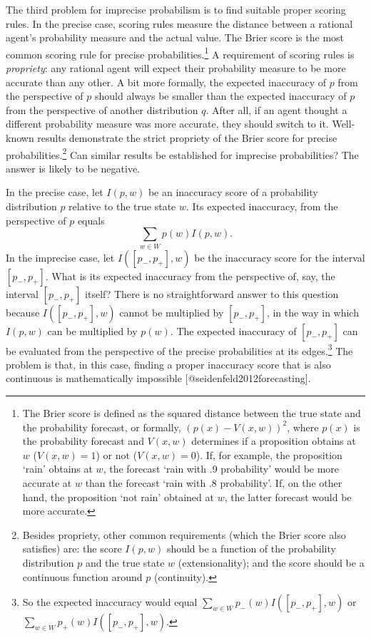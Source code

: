 \documentclass[
  letterpaper,
  DIV=11,
  numbers=noendperiod]{scrartcl}
\begin{document}
The third problem for imprecise probabilism is to find suitable proper
scoring rules. In the precise case, scoring rules measure the distance
between a rational agent's probability measure and the actual value. The
Brier score is the most common scoring rule for precise
probabilities.\footnote{The Brier score is defined as the squared
  distance between the true state and the probability forecast, or
  formally, \((p(x)-V(x, w))^2\), where \(p(x)\) is the probability
  forecast and \(V(x, w)\) determines if a proposition obtains at \(w\)
  (\(V(x, w)=1\)) or not (\(V(x, w)=0\)). If, for example, the
  proposition `rain' obtains at \(w\), the forecast `rain with .9
  probability' would be more accurate at \(w\) than the forecast `rain
  with .8 probability'. If, on the other hand, the proposition `not
  rain' obtained at \(w\), the latter forecast would be more accurate.}
A requirement of scoring rules is \emph{propriety}: any rational agent
will expect their probability measure to be more accurate than any
other. A bit more formally, the expected inaccuracy of \(p\) from the
perspective of \(p\) should always be smaller than the expected
inaccuracy of \(p\) from the perspective of another distribution \(q\).
After all, if an agent thought a different probability measure was more
accurate, they should switch to it. Well-known results demonstrate the
strict propriety of the Brier score for precise
probabilities.\footnote{Besides propriety, other common requirements
  (which the Brier score also satisfies) are: the score \(I(p, w)\)
  should be a function of the probability distribution \(p\) and the
  true state \(w\) (extensionality); and the score should be a
  continuous function around \(p\) (continuity).} Can similar results be
established for imprecise probabilities? The answer is likely to be
negative.

In the precise case, let \(I(p, w)\) be an inaccuracy score of a
probability distribution \(p\) relative to the true state \(w\). Its
expected inaccuracy, from the perspective of \(p\) equals
\[\sum_{w \in W}p(w)I(p, w).\] \noindent In the imprecise case, let
\(I([p_-, p_+], w)\) be the inaccuracy score for the interval
\([p_-, p_+]\). What is its expected inaccuracy from the perspective of,
say, the interval \([p_-, p_+]\) itself? There is no straightforward
answer to this question because \(I([p_-, p_+], w)\) cannot be
multiplied by \([p_-, p_+]\), in the way in which \(I(p, w)\) can be
multiplied by \(p(w)\). The expected inaccuracy of \([p_-, p_+]\) can be
evaluated from the perspective of the precise probabilities at its
edges.\footnote{So the expected inaccuracy would equal
  \(\sum_{w\in W} p_-(w)I([p_-, p_+], w)\) or
  \(\sum_{w\in W} p_+(w)I([p_-, p_+], w).\)} The problem is that, in
this case, finding a proper inaccuracy score that is also continuous is
mathematically impossible {[}@seidenfeld2012forecasting{]}.
\end{document}
